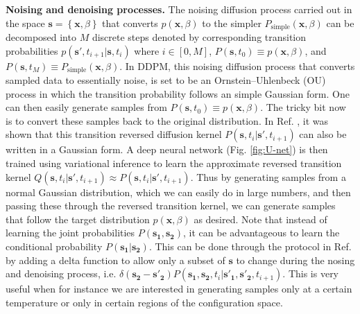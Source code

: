 \documentclass[9pt,twocolumn,twoside]{pnas-new}
\newcommand{\yh}{\textcolor{green}}
\newcommand{\onlinecite}[1]{\hspace{-1 ex} \nocite{#1}\citenum{#1}}
\begin{document}
\textbf{Noising and denoising processes.} The noising diffusion process carried out in the space $\mathbf{s}=\left\{\mathbf{x},\beta\right \}$ that converts $p(\mathbf{x},\beta)$ to the simpler $P_{\text{simple}}(\mathbf{x},\beta)$ can be decomposed into $M$ discrete steps denoted by corresponding transition probabilities $p( \mathbf{s'}, t_{i+1}| \mathbf{s}, t_i)$ where $i\in[0,M]$, $P(\mathbf{s},t_0) \equiv p(\mathbf{x},\beta) $, and $P(\mathbf{s},t_M) \equiv P_{\text{simple}}(\mathbf{x},\beta)$. In DDPM, this noising diffusion process that converts sampled data to essentially noise, is set to be an Ornstein--Uhlenbeck (OU) process in which the transition probability follows an simple Gaussian form. One can then easily generate samples from $P(\mathbf{s},t_0) \equiv p(\mathbf{x},\beta) $. The tricky bit now is to convert these samples back to the original distribution. In Ref. \onlinecite{DPM}, it was shown that this transition reversed diffusion kernel $P( \mathbf{s}, t_{i}| \mathbf{s'}, t_{i+1})$ can also be written in a Gaussian form. A deep neural network (Fig. \ref{fig:U-net}) is then trained using variational inference to learn the approximate reversed transition kernel $Q( \mathbf{s}, t_{i}| \mathbf{s'}, t_{i+1}) \approx P( \mathbf{s}, t_{i}| \mathbf{s'}, t_{i+1}) $. Thus by generating samples from a normal Gaussian distribution, which we can easily do in large numbers, and then passing these through the reversed transition kernel, we can generate samples that follow the target distribution $p(\mathbf{x},\beta)$ as desired. Note that instead of learning the joint probabilities $P(\mathbf{s_1},\mathbf{s_2})$, it can be advantageous to learn the conditional probability $P(\mathbf{s_1}|\mathbf{s_2})$. This can be done through the protocol in Ref. \onlinecite{DPM} by adding a delta function to allow only a subset of $\mathbf{s}$ to change during the nosing and denoising process, i.e. $\delta(\mathbf{s_2} - \mathbf{s'_2})P( \mathbf{s_1}, \mathbf{s_2}, t_{i}| \mathbf{s'_1}, \mathbf{s'_2},  t_{i+1}) $. This is very useful when for instance we are interested in generating samples only at a certain temperature or only in certain regions of the configuration space.
\end{document}

